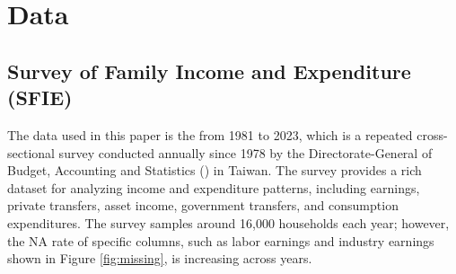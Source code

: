 \documentclass{article}
\begin{document}
\section{Data}
\label{sec:data}

\subsection{Survey of Family Income and Expenditure (SFIE)}

The data used in this paper is the  from 1981 to 2023, which is a repeated cross-sectional survey conducted annually since 1978 by the Directorate-General of Budget, Accounting and Statistics (\citeauthor{DGBAS_SFIE}) in Taiwan.
The survey provides a rich dataset for analyzing income and expenditure patterns, including earnings, private transfers, asset income, government transfers, and consumption expenditures.
The survey samples around 16,000 households each year; however, the NA rate of specific columns, such as labor earnings and industry earnings shown in Figure \ref{fig:missing}, is increasing across years.
\end{document}
